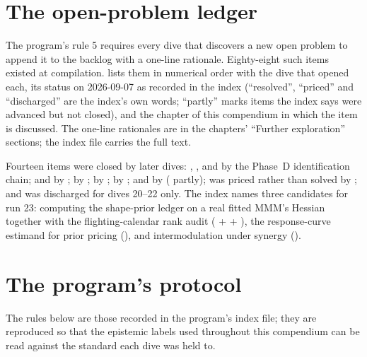 \chapter{The open-problem ledger}
\label{app:ledger}

The program's rule 5 requires every dive that discovers a new open problem to append it to the backlog with a
one-line rationale. Eighty-eight such items existed at compilation.  lists them in numerical
order with the dive that opened each, its status on 2026-09-07 as recorded in the index (``resolved'',
``priced'' and ``discharged'' are the index's own words; ``partly'' marks items the index says were advanced
but not closed), and the chapter of this compendium in which the item is discussed. The one-line rationales
are in the chapters' ``Further exploration'' sections; the index file carries the full text.

Fourteen items were closed by later dives: , ,  and  by the Phase~D identification
chain;  and  by ;  by ;  by ;  by ;
 and  by  ( partly);  was priced rather than solved by ; and
 was discharged for dives 20--22 only. The index names three candidates for run 23: computing the
shape-prior ledger on a real fitted MMM's Hessian together with the flighting-calendar rank audit
( +  + ), the response-curve estimand for prior pricing (), and intermodulation
under synergy ().

\small

\normalsize

\chapter{The program's protocol}
\label{app:protocol}

The rules below are those recorded in the program's index file; they are reproduced so that the epistemic
labels used throughout this compendium can be read against the standard each dive was held to.

